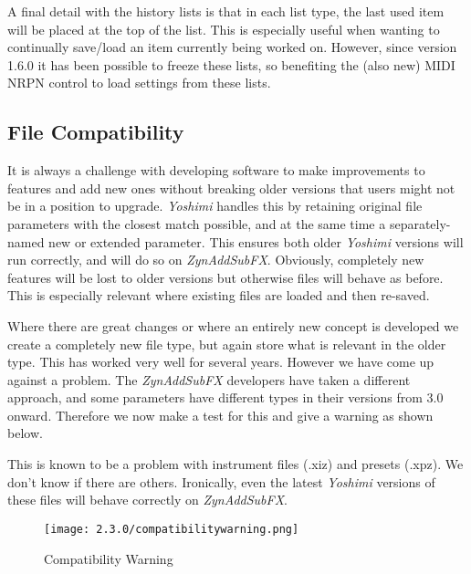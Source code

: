 \documentclass[
 11pt,
 twoside,
 a4paper,
 final                                 %
]{article}
\begin{document}
   A final detail with the history lists is that in each list type, the last
   used item will be placed at the top of the list. This is especially useful
   when wanting to continually save/load an item currently being worked on.
   However, since version 1.6.0 it has been possible to freeze these lists,
   so benefiting the (also new) MIDI NRPN control to load settings from these
   lists.

\subsection{File Compatibility}
\label{subsec:file_compatibility}

   It is always a challenge with developing software to make improvements to
   features and add new ones without breaking older versions that users might
   not be in a position to upgrade. \textsl{Yoshimi} handles this by
   retaining original file parameters with the closest match possible, and at
   the same time a separately-named new or extended parameter. This ensures
   both older \textsl{Yoshimi} versions will run correctly,
   and will do so on \textsl{ZynAddSubFX}.
   Obviously, completely new features will be lost to
   older versions but otherwise files will behave as before. This is
   especially relevant where existing files are loaded and then re-saved.

   Where there are great changes or where an entirely new concept is
   developed we create a completely new file type, but again store what is
   relevant in the older type.
   This has worked very well for several years. However we have come up
   against a problem. The \textsl{ZynAddSubFX} developers have taken a
   different approach, and some parameters have different types in their
   versions from 3.0 onward. Therefore we now make a test for this and give
   a warning as shown below.


   This is known to be a problem with instrument files (.xiz) and presets
   (.xpz). We don't know if there are others. Ironically, even the latest
   \textsl{Yoshimi} versions of these files will behave correctly on
   \textsl{ZynAddSubFX}.

\begin{figure}[H]
   \centering
   \texttt{[image: 2.3.0/compatibilitywarning.png]}
   \caption{Compatibility Warning}
   \label{fig:compatibiilty_warning}
\end{figure}
\end{document}
